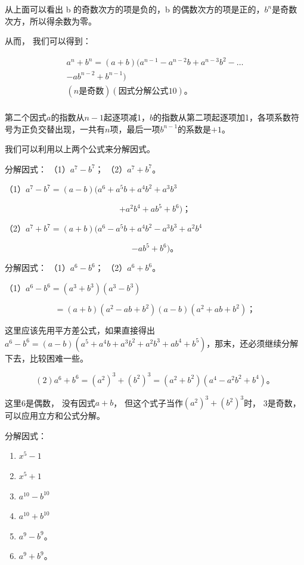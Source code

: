 从上面可以看出 b 的奇数次方的项是负的，b
的偶数次方的项是正的，\(b^{n}\)是奇数次方，所以得余数为零。

从而， 我们可以得到：

\[
\begin{array}{l} a ^{n} + b ^{n} = (a + b) (a ^{n - 1} - a ^{n - 2} b + a ^{n - 3} b ^{2} - \dots \\ - a b ^{n - 2} + b ^{n - 1}) \\ (n \text{是奇数}) (\text{因式分解公式} 10)\text{。} \\ \end{array}
\]

第二个因式\(a\)的指数从\(n - 1\)起逐项减1，\(b\)的指数从第二项起逐项加1，各项系数符号为正负交替出现，一共有\(n\)项，最后一项\(b^{n - 1}\)的系数是\(+1\)。

我们可以利用以上两个公式来分解因式。

 分解因式： （1）\(a^7 - b^7\)； （2）\(a^7 + b^7\)。

（1）\(a^7 - b^7 = (a - b)(a^6 + a^5b + a^4b^2 + a^3b^3\)

\[
+ a ^{2} b ^{4} + a b ^{5} + b ^{6})\text{；}
\]

（2）\(a^7 + b^7 = (a + b)(a^6 - a^5b + a^4b^2 - a^3b^3 + a^2b^4\)

\[
- a b ^{5} + b ^{6})\text{。}
\]

 分解因式： （1）\(a^6 - b^6\)； （2）\(a^6 + b^6\)。

 （1）\(a^6 - b^6 = (a^3 + b^3)(a^3 - b^3)\)

\[
= (a + b) \left(a ^{2} - a b + b ^{2}\right) (a - b) \left(a ^{2} + a b + b ^{2}\right)\text{；}
\]

这里应该先用平方差公式，如果直接得出\(a^6 - b^6 = (a - b)(a^5 + a^4b + a^3b^2 + a^2b^3 + ab^4 + b^5)\)，那末，还必须继续分解下去，比较困难一些。


\[
(2) a ^{6} + b ^{6} = (a ^{2}) ^{3} + (b ^{2}) ^{3} = (a ^{2} + b ^{2}) (a ^{4} - a ^{2} b ^{2} + b ^{4})\text{。}
\]

这里6是偶数， 没有因式\(a + b\)，
但这个式子当作\((a^2)^3 + (b^2)^3\)时， 3是奇数，
可以应用立方和公式分解。

分解因式：

\begin{enumerate}[start=1]
\item
  \(x^{5} - 1\)
\item
  \(x^{5} + 1\)
\item
  \(a^{10} - b^{10}\)
\item
  \(a^{10} + b^{10}\)
\item
  \(a^9 - b^9\)。
\item
  \(a^9 + b^9\)。
\end{enumerate}

